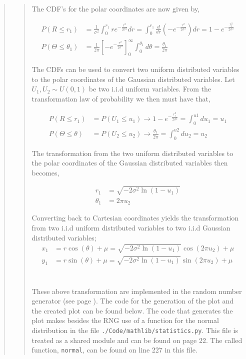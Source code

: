 \begin{quote}
\begin{quote}
The CDF's  for the polar coordinates are now given by, %

\begin{align}
P(R \leq r_1) &= \frac{1}{\sigma^2} \int_{0}^{r_1}  re^{ -\frac{r^2}{2 \sigma ^2} } dr =  \int_{0}^{r_1} \frac{d}{dr} \left( -e^{ -\frac{r^2}{2 \sigma ^2}}  \right) dr = 1 - e^{- \frac{r_1^2}{2 \sigma^2}} \\
P(\Theta \leq \theta_1) &= \frac{1}{2 \pi }  \left[ -e^{-\frac{r^2}{2 \sigma^2}} \right]^{\infty}_{0} \int_{0}^{\theta_1} d\theta = \frac{\theta_1}{2\pi}
\end{align}

The CDFs can be used to convert  two uniform distributed variables to the polar coordinates of the Gaussian distributed variables. Let $U_1, U_2 \sim U(0,1)$ be two i.i.d uniform variables. From the transformation law of probability we then must have that, %

\begin{align}
P(R \leq r_1) &= P(U_1 \leq u_1) \rightarrow  1 - e^{- \frac{r_1^2}{2\sigma^2}}  = \int_{0}^{u1} du_1 = u_1 \\
P(\Theta \leq \theta) &= P(U_2 \leq u_2) \rightarrow   \frac{\theta_1}{2\pi} = \int_{0}^{u2} du_2 = u_2 
\end{align}

The transformation from the two uniform distributed variables to the polar coordinates of the Gaussian distributed variables then becomes,

\begin{align}
r_1 &=  \sqrt{-2\sigma^2 \ln(1 - u_1)} \\
\theta_1 &= 2 \pi u_2
\end{align}

Converting back to Cartesian coordinates  yields the transformation from two i.i.d uniform distributed variables to two i.i.d Gaussian distributed variables;
\begin{align}
x_1 &= r\cos(\theta) + \mu = \sqrt{-2\sigma^2 \ln(1 - u_1)} \cos( 2 \pi u_2 ) + \mu \\
y_1 &= r\sin(\theta) + \mu = \sqrt{-2\sigma^2 \ln(1 - u_1)} \sin( 2 \pi u_2 ) + \mu
\label{EQ:boxmuller}
\end{align}
\\
\\
These above transformation are implemented in  the random number generator (see page \pageref{CODE:RNG}).  The code for the generation of the plot and the created plot can be found below. The code that generates the plot makes besides the RNG use of a function for the normal distribution in the file \texttt{./Code/mathlib/statistics.py}. This file is treated as a shared module and can be found on page 22. The called function, \texttt{normal}, can be found on line 227 in this file.



\end{quote}
\end{quote}

